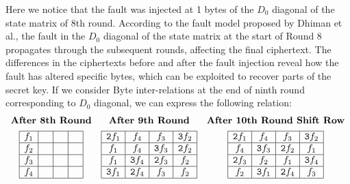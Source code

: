 Here we notice that the fault was injected at 1 bytes of the $D_0$ diagonal of the state matrix of 8th round. According to the fault model proposed by Dhiman et al.,\cite{Saha2009ADF} the fault in the $D_0$ diagonal of the state matrix at the start of Round 8 propagates through the subsequent rounds, affecting the final ciphertext. The differences in the ciphertexts before and after the fault injection reveal how the fault has altered specific bytes, which can be exploited to recover parts of the secret key. 
If we consider Byte inter-relations at the end of ninth round corresponding to $D_0$ diagonal, we can express the following relation:
\[
\begin{array}{ccc}
    \textbf{After 8th Round} & \textbf{After 9th Round} & \textbf{After 10th Round Shift Row} \\[1ex]
    \begin{array}{|c|c|c|c|}
        \hline
        \texttt{$f_1$} & \texttt{ } & \texttt{ } &  \texttt{ }\\
        \hline
        \texttt{$f_2$} & \texttt{ } & \texttt{ } &  \texttt{ }  \\
        \hline
        \texttt{$f_3$} & \texttt{ } & \texttt{ } &  \texttt{ }  \\
        \hline
        \texttt{$f_4$}& \texttt{ } & \texttt{ } &  \texttt{ }  \\
        \hline
    \end{array}
&

\begin{array}{|c|c|c|c|}
    \hline
    \texttt{2$f_1$} & \texttt{$f_4$} & \texttt{$f_3$} & \texttt{3$f_2$} \\
    \hline
    \texttt{$f_1$} & \texttt{$f_4$} & \texttt{3$f_3$} & \texttt{2$f_2$} \\
    \hline
    \texttt{$f_1$} & \texttt{3$f_4$} & \texttt{2$f_3$} & \texttt{$f_2$} \\
    \hline
    \texttt{3$f_1$} & \texttt{2$f_4$} & \texttt{$f_3$} & \texttt{$f_2$} \\
    \hline
\end{array}

    &

    \begin{array}{|c|c|c|c|}
        \hline
        \texttt{2$f_1$} & \texttt{$f_4$} & \texttt{$f_3$} & \texttt{3$f_2$} \\
        \hline
        \texttt{$f_4$} & \texttt{3$f_3$} & \texttt{2$f_2$} & \texttt{$f_1$}\\
        \hline
        \texttt{2$f_3$} & \texttt{$f_2$} & \texttt{$f_1$} & \texttt{3$f_4$} \\
        \hline
        \texttt{$f_2$} & \texttt{3$f_1$} & \texttt{2$f_4$} & \texttt{$f_3$} \\
        \hline
    \end{array}
    
\end{array}
\]
